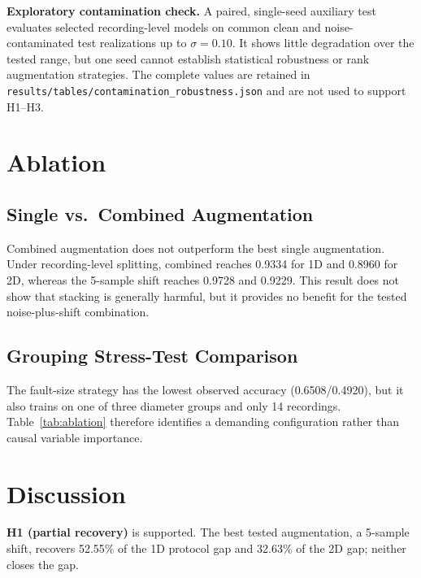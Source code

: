 ﻿\documentclass[11pt,a4paper]{article}
\begin{document}
\textbf{Exploratory contamination check.} A paired, single-seed auxiliary test evaluates selected recording-level models on common clean and noise-contaminated test realizations up to $\sigma=0.10$. It shows little degradation over the tested range, but one seed cannot establish statistical robustness or rank augmentation strategies. The complete values are retained in \texttt{results/tables/contamination\_robustness.json} and are not used to support H1--H3.

\section{Ablation}

\subsection{Single vs.\ Combined Augmentation}

Combined augmentation does not outperform the best single augmentation. Under recording-level splitting, combined reaches 0.9334 for 1D and 0.8960 for 2D, whereas the 5-sample shift reaches 0.9728 and 0.9229. This result does not show that stacking is generally harmful, but it provides no benefit for the tested noise-plus-shift combination.

\subsection{Grouping Stress-Test Comparison}

The fault-size strategy has the lowest observed accuracy (0.6508/0.4920), but it also trains on one of three diameter groups and only 14 recordings. Table~\ref{tab:ablation} therefore identifies a demanding configuration rather than causal variable importance.

\section{Discussion}

\textbf{H1 (partial recovery)} is supported. The best tested augmentation, a 5-sample shift, recovers 52.55\% of the 1D protocol gap and 32.63\% of the 2D gap; neither closes the gap.
\end{document}
